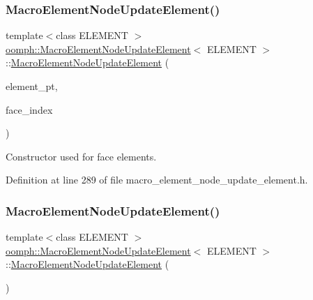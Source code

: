 \subsubsection{\texorpdfstring{Macro\+Element\+Node\+Update\+Element()}{MacroElementNodeUpdateElement()}\hspace{0.1cm}{\footnotesize\ttfamily [2/3]}}
{\footnotesize\ttfamily template$<$class E\+L\+E\+M\+E\+NT $>$ \\
\hyperlink{classoomph_1_1MacroElementNodeUpdateElement}{oomph\+::\+Macro\+Element\+Node\+Update\+Element}$<$ E\+L\+E\+M\+E\+NT $>$\+::\hyperlink{classoomph_1_1MacroElementNodeUpdateElement}{Macro\+Element\+Node\+Update\+Element} (\begin{DoxyParamCaption}\item[{\hyperlink{classoomph_1_1FiniteElement}{Finite\+Element} $\ast$const \&}]{element\+\_\+pt,  }\item[{const int \&}]{face\+\_\+index }\end{DoxyParamCaption})\hspace{0.3cm}{\ttfamily [inline]}}



Constructor used for face elements. 



Definition at line 289 of file macro\+\_\+element\+\_\+node\+\_\+update\+\_\+element.\+h.

\mbox{\label{classoomph_1_1MacroElementNodeUpdateElement_a52d1a2a2ae623a1a459c217d82f3cedd}} 
\subsubsection{\texorpdfstring{Macro\+Element\+Node\+Update\+Element()}{MacroElementNodeUpdateElement()}\hspace{0.1cm}{\footnotesize\ttfamily [3/3]}}
{\footnotesize\ttfamily template$<$class E\+L\+E\+M\+E\+NT $>$ \\
\hyperlink{classoomph_1_1MacroElementNodeUpdateElement}{oomph\+::\+Macro\+Element\+Node\+Update\+Element}$<$ E\+L\+E\+M\+E\+NT $>$\+::\hyperlink{classoomph_1_1MacroElementNodeUpdateElement}{Macro\+Element\+Node\+Update\+Element} (\begin{DoxyParamCaption}\item[{const \hyperlink{classoomph_1_1MacroElementNodeUpdateElement}{Macro\+Element\+Node\+Update\+Element}$<$ E\+L\+E\+M\+E\+NT $>$ \&}]{ }\end{DoxyParamCaption})\hspace{0.3cm}{\ttfamily [inline]}}



